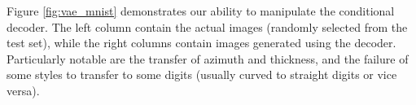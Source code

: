Figure \ref{fig:vae_mnist} demonstrates our ability to manipulate the conditional decoder. The left column contain the actual images (randomly selected from the test set), while the right columns contain images generated using the decoder.  Particularly notable are the transfer of azimuth and thickness, and the failure of some styles to transfer to some digits (usually curved to straight digits or vice versa).

